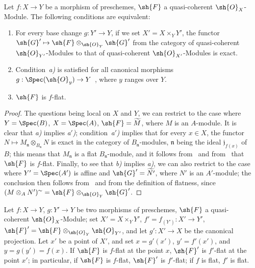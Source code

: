 \begin{proposition}[2.1.3]
\label{IV.2.1.3}
Let $f:X\to Y$ be a morphism of preschemes, $\sh{F}$ a quasi-coherent $\sh{O}_X$-Module. The following conditions are equivalent:
\begin{enumerate}
  \item[\emph{a)}] For every base change $g:Y'\to Y$, if we set $X'=X\times_Y Y'$, the functor $\sh{G}'\mapsto\sh{F}\otimes_{\sh{O}_Y}\sh{G}'$ from the category of quasi-coherent $\sh{O}_{Y'}$-Modules to that of quasi-coherent $\sh{O}_{X'}$-Modules is exact.
  \item[\emph{a$'$)}] Condition~\emph{a)} is satisfied for all canonical morphisms $g:\Spec(\sh{O}_y)\to Y$~, where $y$ ranges over $Y$.
  \item[\emph{b)}] $\sh{F}$ is $f$-flat.
\end{enumerate}
\end{proposition}

\begin{proof}
The questions being local on $X$ and $Y$, we can restrict to the case where $Y=\Spec(B)$, $X=\Spec(A)$, $\sh{F}=\widetilde{M}$, where $M$ is an $A$-module.
It is clear that \emph{a)} implies \emph{a$'$)};
condition~\emph{a$'$)} implies that for every $x\in X$, the functor $N\mapsto M_\mathfrak{n}\otimes_{B_\mathfrak{n}}N$ is exact in the category of $B_\mathfrak{n}$-modules, $\mathfrak{n}$ being the ideal $\mathfrak{j}_{f(x)}$ of $B$; this means that $M_\mathfrak{n}$ is a flat $B_\mathfrak{n}$-module, and it follows from~ and from~ that $\sh{F}$ is $f$-flat.
Finally, to see that \emph{b)} implies \emph{a)}, we can also restrict to the case where $Y'=\Spec(A')$ is affine and $\sh{G}'=\widetilde{N'}$, where $N'$ is an $A'$-module; the conclusion then follows from~ and from the definition of flatness, since $(M\otimes_A N')^{\sim}=\sh{F}\otimes_{\sh{O}_Y}\sh{G}'$.
\end{proof}

\begin{proposition}[2.1.4]
\label{IV.2.1.4}
Let $f:X\to Y$, $g:Y'\to Y$ be two morphisms of preschemes, $\sh{F}$ a quasi-coherent $\sh{O}_X$-Module; set $X'=X\times_Y Y'$, $f'=f_{(Y')}:X'\to Y'$, $\sh{F}'=\sh{F}\otimes_{\sh{O}_Y}\sh{O}_{Y'}$, and let $g':X'\to X$ be the canonical projection.
Let $x'$ be a point of $X'$, and set $x=g'(x')$, $y'=f'(x')$, and $y=g(y')=f(x)$.
If $\sh{F}$ is $f$-flat at the point $x$, $\sh{F}'$ is $f'$-flat at the point $x'$; in particular, if $\sh{F}$ is $f$-flat, $\sh{F}'$ is $f'$-flat; if $f$ is flat, $f'$ is flat.
\end{proposition}


